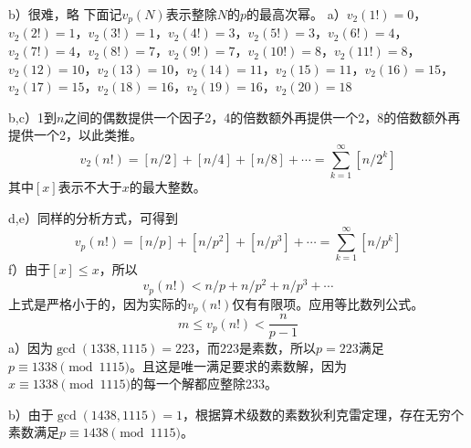 b）很难，略
%
\exercise 下面记$v_p(N)$表示整除$N$的$p$的最高次幂。
a）$v_2(1!)=0$，$v_2(2!)=1$，$v_2(3!)=1$，$v_2(4!)=3$，$v_2(5!)=3$，$v_2(6!)=4$，$v_2(7!)=4$，$v_2(8!)=7$，$v_2(9!)=7$，$v_2(10!)=8$，$v_2(11!)=8$，$v_2(12)=10$，$v_2(13)=10$，$v_2(14)=11$，$v_2(15)=11$，$v_2(16)=15$，$v_2(17)=15$，$v_2(18)=16$，$v_2(19)=16$，$v_2(20)=18$\par
b,c）1到$n$之间的偶数提供一个因子2，4的倍数额外再提供一个2，8的倍数额外再提供一个2，以此类推。
\[v_2(n!)=[n/2]+[n/4]+[n/8]+\cdots=\sum_{k=1}^\infty [n/2^k]\]
其中$[x]$表示不大于$x$的最大整数。\par
d,e）同样的分析方式，可得到
\[v_p(n!)=[n/p]+[n/p^2]+[n/p^3]+\cdots=\sum_{k=1}^\infty [n/p^k]\]
f）由于$[x]\le x$，所以
\[v_p(n!)<n/p+n/p^2+n/p^3+\cdots\]
上式是严格小于的，因为实际的$v_p(n!)$仅有有限项。应用等比数列公式。
\[m\le v_p(n!)<\frac{n}{p-1}\]
%
\exercise a）因为$\gcd(1338, 1115)=223$，而$223$是素数，所以$p=223$满足$p\equiv 1338\pmod{1115}$。且这是唯一满足要求的素数解，因为$x\equiv 1338\pmod{1115}$的每一个解都应整除233。\par
b）由于$\gcd(1438,1115)=1$，根据算术级数的素数狄利克雷定理，存在无穷个素数满足$p\equiv 1438\pmod{1115}$。